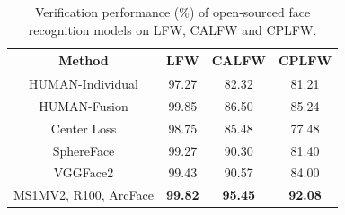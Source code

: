 \documentclass[10pt,twocolumn,letterpaper]{article}
\begin{document}
\begin{table}[t!]
\begin{center}
\begin{tabular}{c|c|c|c}
\hline
Method                                  & LFW & CALFW & CPLFW\\
\hline
HUMAN-Individual                        & 97.27 & 82.32 & 81.21 \\
HUMAN-Fusion                            & 99.85 & 86.50 & 85.24 \\
\hline
Center Loss \cite{wen2016discriminative}&98.75 & 85.48 & 77.48  \\
SphereFace \cite{liu2017sphereface}     &99.27 & 90.30 & 81.40  \\
VGGFace2  \cite{cao2017vggface2}        &99.43 & 90.57 & 84.00   \\
MS1MV2, R100, ArcFace                   &{\bf 99.82} & {\bf 95.45} & {\bf 92.08} \\
\hline
\end{tabular}
\end{center}
\vspace{-2mm}
\caption{Verification performance ($\%$) of open-sourced face recognition models on LFW, CALFW and CPLFW.}
\label{table:calfwandcplfw}
\vspace{-4mm}
\end{table}
\end{document}
